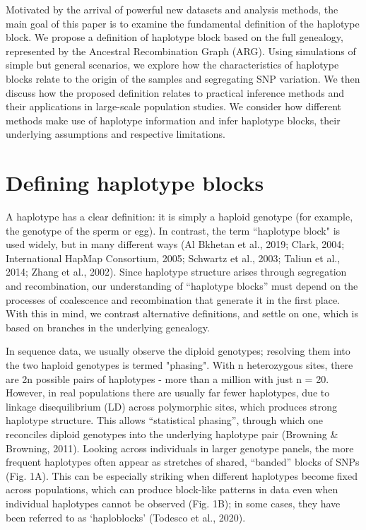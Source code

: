 \documentclass[twocolumn]{bmcart}%
\begin{document}
Motivated by the arrival of powerful new datasets and analysis methods, the main goal of this paper is to examine the fundamental definition of the haplotype block. We propose a definition of haplotype block based on the full genealogy, represented by the Ancestral Recombination Graph (ARG). Using simulations of simple but general scenarios, we explore how the characteristics of haplotype blocks relate to the origin of the samples and segregating SNP variation. We then discuss how the proposed definition relates to practical inference methods and their applications in large-scale population studies. We consider how different methods make use of haplotype information and infer haplotype blocks, their underlying assumptions and respective limitations.

\section*{Defining haplotype blocks}
A haplotype has a clear definition: it is simply a haploid genotype (for example, the genotype of the sperm or egg). In contrast, the term “haplotype block" is used widely, but in many different ways (Al Bkhetan et al., 2019; Clark, 2004; International HapMap Consortium, 2005; Schwartz et al., 2003; Taliun et al., 2014; Zhang et al., 2002). Since haplotype structure arises through segregation and recombination, our understanding of “haplotype blocks” must depend on the processes of coalescence and recombination that generate it in the first place. With this in mind, we contrast alternative definitions, and settle on one, which is based on branches in the underlying genealogy.

In sequence data, we usually observe the diploid genotypes; resolving them into the two haploid genotypes is termed "phasing". With n heterozygous sites, there are 2n possible pairs of haplotypes - more than a million with just n = 20. However, in real populations there are usually far fewer haplotypes, due to linkage disequilibrium (LD) across polymorphic sites, which produces strong haplotype structure. This allows “statistical phasing”, through which one reconciles diploid genotypes into the underlying haplotype pair (Browning \& Browning, 2011). Looking across individuals in larger genotype panels, the more frequent haplotypes often appear as stretches of shared, “banded” blocks of SNPs (Fig. 1A). This can be especially striking when different haplotypes become fixed across populations, which can produce block-like patterns in data even when individual haplotypes cannot be observed (Fig. 1B); in some cases, they have been referred to as ‘haploblocks’ (Todesco et al., 2020).
\end{document}
